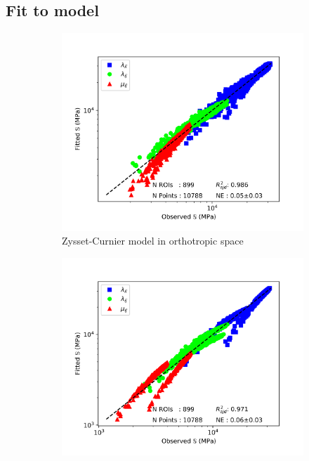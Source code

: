 \documentclass[a4paper,fleqn]{DC_ArtStyle}
\begin{document}
	\subsection{Fit to model}
	\begin{figure}
		\centering
		\begin{subfigure}[t]{.3\linewidth}
			\includegraphics[height=0.8\linewidth]{../Results/StandardOrthoModel}
			\caption{Zysset-Curnier model in orthotropic space}
		\end{subfigure}
		\begin{subfigure}[t]{.3\linewidth}
			\includegraphics[height=0.8\linewidth]{../Results/StandardTransModel}

\end{subfigure}
\end{figure}
\end{document}
